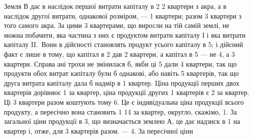 Земля $В$ дає в наслідок першої витрати капіталу в 2 2 квартери
з акра, а в наслідок другої витрати, однакової розміром, — 1 квартери; разом
3 квартери з того самого акра. За цими 3 квартерами, що виросли
на тій самій землі, не можна побачити, яка частина з них є продуктом витрати
капіталу І і яка витрати капіталу II.~Вони в дійсності становлять продукт
усього капіталу в 5; і дійсний факт є лише в тому, що капітал
в 2 дав 2 квартери, а капітал в 5 — не 4, а 3 квартери.
Справа ані трохи не змінилася б, якби ці 5 дали 4 квартери, так що
продукти обох витрат капіталу були б однакові, або навіть 5 квартерів, так
що друга витрата капіталу дала б надмір в 1 квартер. Ціна продукції перших
двох квартерів дорівнює 1 за квартер, ціна продукції других 1 квартерів є 2 за квартер. Ці 3 квартери разом коштують тому 6.
Це є індивідуальна ціна продукції всього продукту, а пересічно вона становить
1 14 за квартер, округло, скажімо, 1. За загальної ціни
продукції в 3, що визначається землею $А$, це дає надзиск в 1
на квартер і, отже, для 3 квартерів разом. — 4. За пересічної ціни
\parbreak{}  %
